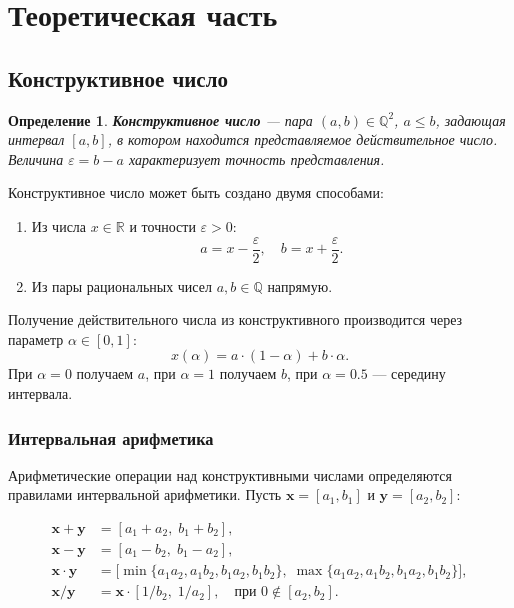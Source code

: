\documentclass[a4paper, 14pt]{extarticle}
\newtheorem{definition}{Определение}
\begin{document}
\section{Теоретическая часть}

\subsection{Конструктивное число}

\begin{definition}
\textbf{Конструктивное число} --- пара $(a, b) \in \mathbb{Q}^2$, $a \le b$, задающая интервал $[a, b]$, в котором находится представляемое действительное число. Величина $\varepsilon = b - a$ характеризует точность представления.
\end{definition}

Конструктивное число может быть создано двумя способами:
\begin{enumerate}
    \item Из числа $x \in \mathbb{R}$ и точности $\varepsilon > 0$:
    \[
        a = x - \frac{\varepsilon}{2}, \quad b = x + \frac{\varepsilon}{2}.
    \]
    \item Из пары рациональных чисел $a, b \in \mathbb{Q}$ напрямую.
\end{enumerate}

Получение действительного числа из конструктивного производится через параметр $\alpha \in [0, 1]$:
\[
    x(\alpha) = a \cdot (1 - \alpha) + b \cdot \alpha.
\]
При $\alpha = 0$ получаем $a$, при $\alpha = 1$ получаем $b$, при $\alpha = 0.5$ --- середину интервала.

\subsubsection{Интервальная арифметика}

Арифметические операции над конструктивными числами определяются правилами интервальной арифметики. Пусть $\mathbf{x} = [a_1, b_1]$ и $\mathbf{y} = [a_2, b_2]$:

\begin{align}
    \mathbf{x} + \mathbf{y} &= [a_1 + a_2,\; b_1 + b_2], \label{eq:add}\\
    \mathbf{x} - \mathbf{y} &= [a_1 - b_2,\; b_1 - a_2], \label{eq:sub}\\
    \mathbf{x} \cdot \mathbf{y} &= \bigl[\min\{a_1 a_2, a_1 b_2, b_1 a_2, b_1 b_2\},\; \max\{a_1 a_2, a_1 b_2, b_1 a_2, b_1 b_2\}\bigr], \label{eq:mul}\\
    \mathbf{x} / \mathbf{y} &= \mathbf{x} \cdot [1/b_2,\; 1/a_2], \quad \text{при } 0 \notin [a_2, b_2]. \label{eq:div}
\end{align}
\end{document}
